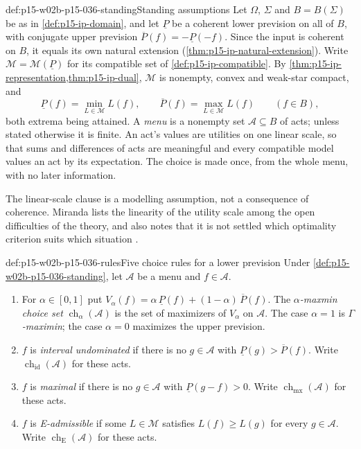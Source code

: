 \begin{hbconvention}{def:p15-w02b-p15-036-standing}{Standing assumptions}
Let \(\Omega\), \(\Sigma\) and \(B=B(\Sigma)\) be as in
\cref{def:p15-ip-domain}, and let \(\underline P\) be a coherent lower
prevision on all of \(B\), with conjugate upper prevision
\(\overline P(f)=-\underline P(-f)\). Since the input is coherent on
\(B\), it equals its own natural extension
(\cref{thm:p15-ip-natural-extension}). Write
\(\mathcal M=\mathcal M(\underline P)\) for its compatible set of
\cref{def:p15-ip-compatible}. By
\cref{thm:p15-ip-representation,thm:p15-ip-dual}, \(\mathcal M\) is
nonempty, convex and weak-star compact, and
\[
 \underline P(f)=\min_{L\in\mathcal M}L(f),\qquad
 \overline P(f)=\max_{L\in\mathcal M}L(f)\qquad(f\in B),
\]
both extrema being attained. A \emph{menu} is a nonempty set
\(\mathcal A\subseteq B\) of acts; unless stated otherwise it is finite.
An act's values are utilities on one linear scale, so that sums and
differences of acts are meaningful and every compatible model values an
act by its expectation. The choice is made once, from the whole menu, with
no later information.
\end{hbconvention}

The linear-scale clause is a modelling assumption, not a consequence of
coherence. Miranda lists the linearity of the utility scale among the open
difficulties of the theory, and also notes that it is not settled which
optimality criterion suits which situation
\cite[§7, p.~38]{MirandaCoherentLowerPrevisionsCapture}.

\begin{hbdefinition}{def:p15-w02b-p15-036-rules}{Five choice rules for a lower prevision}
Under \cref{def:p15-w02b-p15-036-standing}, let \(\mathcal A\) be a menu
and \(f\in\mathcal A\).
\begin{enumerate}
\item For \(\alpha\in[0,1]\) put
 \(V_\alpha(f)=\alpha\,\underline P(f)+(1-\alpha)\,\overline P(f)\).
 The \emph{\(\alpha\)-maxmin choice set}
 \(\operatorname{ch}_\alpha(\mathcal A)\) is the set of maximizers of
 \(V_\alpha\) on \(\mathcal A\). The case \(\alpha=1\) is
 \emph{\(\Gamma\)-maximin}; the case \(\alpha=0\) maximizes the upper
 prevision.
\item \(f\) is \emph{interval undominated} if there is no
 \(g\in\mathcal A\) with \(\underline P(g)>\overline P(f)\). Write
 \(\operatorname{ch}_{\mathrm{id}}(\mathcal A)\) for these acts.
\item \(f\) is \emph{maximal} if there is no \(g\in\mathcal A\) with
 \(\underline P(g-f)>0\). Write
 \(\operatorname{ch}_{\mathrm{mx}}(\mathcal A)\) for these acts.
\item \(f\) is \emph{E-admissible} if some \(L\in\mathcal M\) satisfies
 \(L(f)\geq L(g)\) for every \(g\in\mathcal A\). Write
 \(\operatorname{ch}_{\mathrm E}(\mathcal A)\) for these acts.
\end{enumerate}
\end{hbdefinition}

